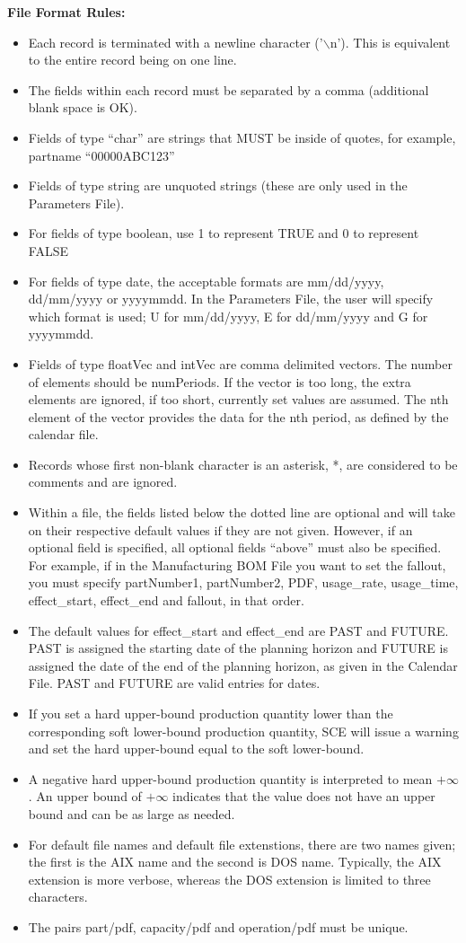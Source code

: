 \noindent
{\bf File Format Rules:}
\begin{itemize}
\item Each record is terminated with a newline character ('$\backslash$n').  This is
  equivalent to the entire record being on one line.
\item The fields within each record must be separated by a comma (additional
  blank space is OK).
\item Fields of type ``char'' are strings that MUST be inside of quotes, for example,
  partname ``00000ABC123''
\item Fields of type string are unquoted strings (these are only used
  in the Parameters File).
\item For fields of type boolean, use 1 to represent TRUE and 0 to
  represent FALSE
\item For fields of type date, the acceptable formats are mm/dd/yyyy, 
  dd/mm/yyyy or yyyymmdd.  In the Parameters File, the user will specify which
  format is used;  U for mm/dd/yyyy, E for dd/mm/yyyy and G for yyyymmdd.
\item Fields of type floatVec and intVec are comma delimited vectors.
  The number of elements should be numPeriods.  If the vector is too
  long, the extra elements are ignored, if too short,  currently set
  values are assumed.  The nth element of the vector provides the
  data for the nth period, as defined by the calendar file.
\item Records whose first non-blank character is an asterisk, *, are 
  considered to be comments and are ignored.
\item Within a file, the fields listed below the dotted line are optional and
 will take on their respective default values if they are not given.  However,
 if an optional field is specified, all optional fields ``above'' must also be
 specified.  For example, if in the Manufacturing BOM File you want to set the
 fallout, you must specify partNumber1, partNumber2, PDF, usage\_rate, 
 usage\_time, effect\_start, effect\_end and fallout, in that order.
\item The default values for effect\_start and effect\_end are PAST and FUTURE.
PAST is assigned the starting date of the planning horizon
and FUTURE is assigned the date of the end of the 
planning horizon, as given in the Calendar File.  PAST and FUTURE are valid entries
for dates.
\item If you set a hard upper-bound production quantity lower than 
the corresponding soft lower-bound production quantity, SCE will issue
a warning and set the hard upper-bound equal to the soft lower-bound.
\item A negative hard upper-bound production quantity is interpreted to
mean $+\infty$.  An upper bound of $+\infty$ indicates that the value
does not have an upper bound and can be as large as needed.
\item For default file names and default file extenstions, there are two
names given;  the first is the AIX name and the second is DOS name.  
Typically, the AIX extension is more verbose, whereas the DOS 
extension is limited to three characters.
\item The pairs part/pdf, capacity/pdf and operation/pdf must be unique.


\end{itemize}
